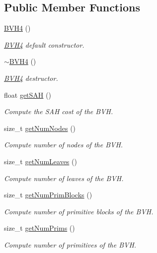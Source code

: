 \subsection*{Public Member Functions}
\begin{DoxyCompactItemize}
\item 
\hyperlink{classembree_1_1_b_v_h4_a302f1a652a1eb650fe2cb4193b1b040e}{BVH4} ()
\begin{DoxyCompactList}\small\item\em \hyperlink{classembree_1_1_b_v_h4}{BVH4} default constructor. \item\end{DoxyCompactList}\item 
\hyperlink{classembree_1_1_b_v_h4_a0ca88ac882e636fb517abd73ffc69fdd}{$\sim$BVH4} ()
\begin{DoxyCompactList}\small\item\em \hyperlink{classembree_1_1_b_v_h4}{BVH4} destructor. \item\end{DoxyCompactList}\item 
float \hyperlink{classembree_1_1_b_v_h4_a30b0a962febc5a36a7476129a60a59ab}{getSAH} ()
\begin{DoxyCompactList}\small\item\em Compute the SAH cost of the BVH. \item\end{DoxyCompactList}\item 
size\_\-t \hyperlink{classembree_1_1_b_v_h4_a73f15ea7b8e6ecb40eb5be77f20cf172}{getNumNodes} ()
\begin{DoxyCompactList}\small\item\em Compute number of nodes of the BVH. \item\end{DoxyCompactList}\item 
size\_\-t \hyperlink{classembree_1_1_b_v_h4_a1087c9275cc54539f47c7053cdc04c36}{getNumLeaves} ()
\begin{DoxyCompactList}\small\item\em Compute number of leaves of the BVH. \item\end{DoxyCompactList}\item 
size\_\-t \hyperlink{classembree_1_1_b_v_h4_a58285dc32de2e6106037d7caed1e5cfb}{getNumPrimBlocks} ()
\begin{DoxyCompactList}\small\item\em Compute number of primitive blocks of the BVH. \item\end{DoxyCompactList}\item 
size\_\-t \hyperlink{classembree_1_1_b_v_h4_ad9fb2676cea62bf4277f3013b543cd75}{getNumPrims} ()
\begin{DoxyCompactList}\small\item\em Compute number of primitives of the BVH. \item\end{DoxyCompactList}\end{DoxyCompactItemize}
